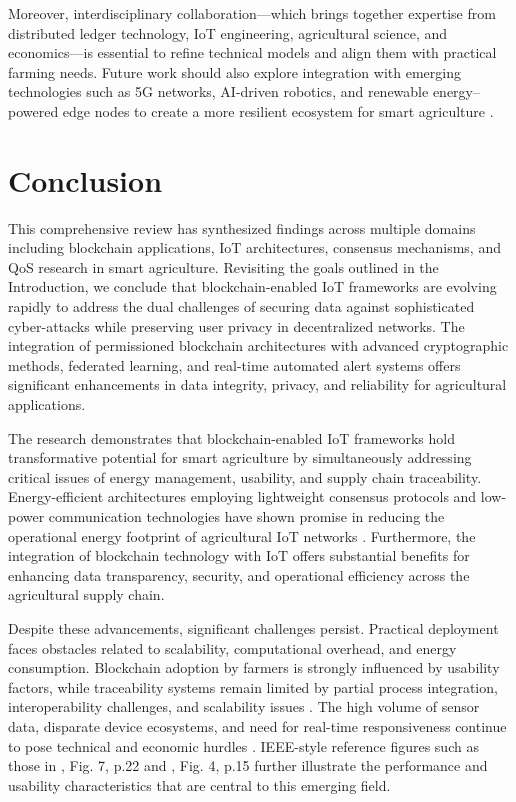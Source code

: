 \documentclass[12pt,onecolumn]{IEEEtran} %
\begin{document}
Moreover, interdisciplinary collaboration---which brings together expertise from distributed ledger technology, IoT engineering, agricultural science, and economics---is essential to refine technical models and align them with practical farming needs. Future work should also explore integration with emerging technologies such as 5G networks, AI-driven robotics, and renewable energy--powered edge nodes to create a more resilient ecosystem for smart agriculture \cite{thiruvenkatasamy2025anonlinetool, alazzai2024smartagriculturesolutions}.

\section{Conclusion}
This comprehensive review has synthesized findings across multiple domains including blockchain applications, IoT architectures, consensus mechanisms, and QoS research in smart agriculture. Revisiting the goals outlined in the Introduction, we conclude that blockchain-enabled IoT frameworks are evolving rapidly to address the dual challenges of securing data against sophisticated cyber-attacks while preserving user privacy in decentralized networks. The integration of permissioned blockchain architectures with advanced cryptographic methods, federated learning, and real-time automated alert systems offers significant enhancements in data integrity, privacy, and reliability for agricultural applications.

The research demonstrates that blockchain-enabled IoT frameworks hold transformative potential for smart agriculture by simultaneously addressing critical issues of energy management, usability, and supply chain traceability. Energy-efficient architectures employing lightweight consensus protocols and low-power communication technologies have shown promise in reducing the operational energy footprint of agricultural IoT networks \cite{munaganuri2025designofan, bapatla2023easychainaniotfriendly}. Furthermore, the integration of blockchain technology with IoT offers substantial benefits for enhancing data transparency, security, and operational efficiency across the agricultural supply chain.

Despite these advancements, significant challenges persist. Practical deployment faces obstacles related to scalability, computational overhead, and energy consumption. Blockchain adoption by farmers is strongly influenced by usability factors, while traceability systems remain limited by partial process integration, interoperability challenges, and scalability issues \cite{akella2023asystematicreview, mwewa2024blockchaintechnologya}. The high volume of sensor data, disparate device ecosystems, and need for real-time responsiveness continue to pose technical and economic hurdles \cite{huang2025digitaltraceabilityin, irfan2025aniotdrivensmart}. IEEE-style reference figures such as those in \cite{munaganuri2025designofan}, Fig. 7, p.22 and \cite{pricetorrejon2025designofa}, Fig. 4, p.15 further illustrate the performance and usability characteristics that are central to this emerging field.
\end{document}
